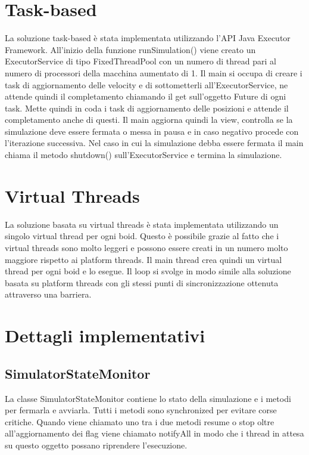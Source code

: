 \documentclass[11pt,notitlepage]{article}
\begin{document}
\section{Task-based}
La soluzione task-based è stata implementata utilizzando l'API Java Executor Framework. All'inizio della funzione \textsf{runSimulation()} viene creato un 
\textsf{ExecutorService} di tipo \textsf{FixedThreadPool} con un numero di thread pari al numero di processori della macchina aumentato di 1.
Il main si occupa di creare i task di aggiornamento delle velocity e di sottometterli all'\textsf{ExecutorService}, ne attende quindi il completamento 
chiamando il get sull'oggetto \textsf{Future} di ogni task. Mette quindi in coda i task di aggiornamento delle posizioni e attende il completamento anche di 
questi. Il main aggiorna quindi la view, controlla se la simulazione deve essere fermata o messa in pausa e in caso negativo procede con l'iterazione successiva.
Nel caso in cui la simulazione debba essere fermata il main chiama il metodo \textsf{shutdown()} sull'\textsf{ExecutorService} e termina la simulazione.

\section{Virtual Threads}
La soluzione basata su virtual threads è stata implementata utilizzando un singolo virtual thread per ogni boid. Questo è possibile
grazie al fatto che i virtual threads sono molto leggeri e possono essere creati in un numero molto maggiore rispetto ai platform threads.
Il main thread crea quindi un virtual thread per ogni boid e lo esegue. Il loop si svolge in modo simile alla soluzione basata su platform threads con gli stessi punti
di sincronizzazione ottenuta attraverso una barriera.

\section{Dettagli implementativi}
\subsection{SimulatorStateMonitor}
La classe \textsf{SimulatorStateMonitor} contiene lo stato della simulazione e i metodi per fermarla e avviarla. Tutti i metodi sono \textsf{synchronized} per evitare
corse critiche. Quando viene chiamato uno tra i due metodi \textsf{resume} o \textsf{stop} oltre all'aggiornamento dei flag viene chiamato \textsf{notifyAll} in modo
che i thread in attesa su questo oggetto possano riprendere l'esecuzione.
\end{document}
